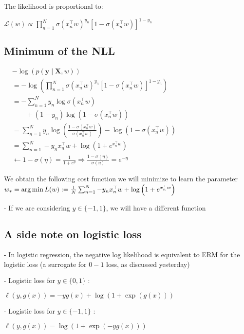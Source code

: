 The likelihood is proportional to:

$
\mathscr{L}(w) \propto \prod_{n=1}^{N} \sigma\left(x_{n}^{\top} w\right)^{y_{n}}\left[1-\sigma\left(x_{n}^{\top} w\right)\right]^{1-y_{n}}
$

\subsection*{Minimum of the NLL}
$
\begin{aligned}
& -\log (p(\mathbf{y} \mid \mathbf{X}, w))
\\ & =-\log \left(\prod_{n=1}^{N} \sigma\left(x_{n}^{\top} w\right)^{y_{n}}\left[1-\sigma\left(x_{n}^{\top} w\right)\right]^{1-y_{n}}\right) \\
& =-\sum_{n=1}^{N} y_{n} \log \sigma\left(x_{n}^{\top} w\right)
\\ & \qquad +\left(1-y_{n}\right) \log \left(1-\sigma\left(x_{n}^{\top} w\right)\right) \\
& =\sum_{n=1}^{N} y_{n} \log \left(\frac{1-\sigma\left(x_{n}^{\top} w\right)}{\sigma\left(x_{n}^{\top} w\right)}\right)-\log \left(1-\sigma\left(x_{n}^{\top} w\right)\right) \\
& =\sum_{n=1}^{N}-y_{n} x_{n}^{\top} w+\log \left(1+e^{x_{n}^{\top} w}\right) 
\\ & \longleftarrow 1-\sigma(\eta)=\frac{1}{1+e^{\eta}} \Longrightarrow \frac{1-\sigma(\eta)}{\sigma(\eta)}=e^{-\eta}
\end{aligned}
$

We obtain the following cost function we will minimize to learn the parameter
$
w_{*}=\arg \min L(w) \\ :=\frac{1}{N} \sum_{n=1}^{N}-y_{n} x_{n}^{\top} w+\log \left(1+e^{x_{n}^{\top} w}\right)
$

- If we are considering $y \in\{-1,1\}$, we will have a different function

\subsection*{A side note on logistic loss}
- In logistic regression, the negative log likelihood is equivalent to ERM for the logistic loss (a surrogate for $0-1$ loss, as discussed yesterday)

- Logistic loss for $y \in\{0,1\}$ :

$
\ell(y, g(x))=-y g(x)+\log (1+\exp (g(x)))
$

- Logistic loss for $y \in\{-1,1\}$ :

$
\ell(y, g(x))=\log (1+\exp (-y g(x)))
$

